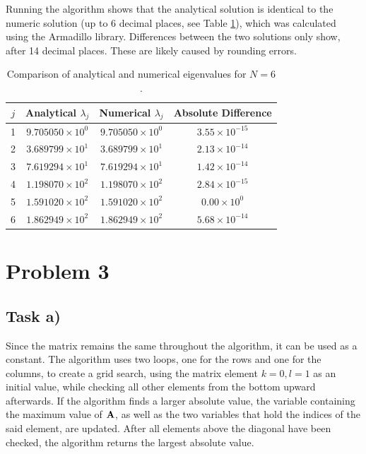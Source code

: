 \documentclass[english,notitlepage]{revtex4-1}  %
\begin{document}
Running the algorithm shows that the analytical solution is identical to 
the numeric solution (up to 6 decimal places, see Table \ref{tab:task2}), which was calculated using the Armadillo library. Differences between the two solutions only show, after 14 decimal places. These are likely caused by rounding errors.

\begin{table}[H]
\centering
\begin{tabular}{cccc}
\hline
$j$ & Analytical $\lambda_j$ & Numerical $\lambda_j$ & Absolute Difference \\
\hline
1 & $9.705050\times 10^{0}$  & $9.705050\times 10^{0}$  & $3.55 \times 10^{-15}$ \\
2 & $3.689799\times 10^{1}$ & $3.689799\times 10^{1}$ & $2.13 \times 10^{-14}$ \\
3 & $7.619294\times 10^{1}$ & $7.619294\times 10^{1}$ & $1.42 \times 10^{-14}$ \\
4 & $1.198070\times 10^{2}$ & $1.198070\times 10^{2}$ & $2.84 \times 10^{-15}$ \\
5 & $1.591020\times 10^{2}$ & $1.591020\times 10^{2}$ & $0.00 \times 10^{0}$ \\
6 & $1.862949\times 10^{2}$ & $1.862949\times 10^{2}$ & $5.68 \times 10^{-14}$ \\
\hline
\end{tabular}
\caption{Comparison of analytical and numerical eigenvalues for $N = 6$.}
\label{tab:task2}
\end{table}


\section*{Problem 3} 
\subsection*{Task a)}
Since the matrix remains the same throughout the algorithm, it can be used as a constant. The algorithm uses two loops, one for the rows and one for the columns, 
to create a grid search, using the matrix element $k = 0, l = 1$ as an initial value, while checking all other elements from the bottom upward afterwards. If the algorithm finds a larger absolute value, the variable containing the maximum value of $\bold{A}$, as well as the two variables that hold the indices of the said element, are updated. After all elements above the diagonal have been checked, the algorithm returns the largest absolute value.
\end{document}

